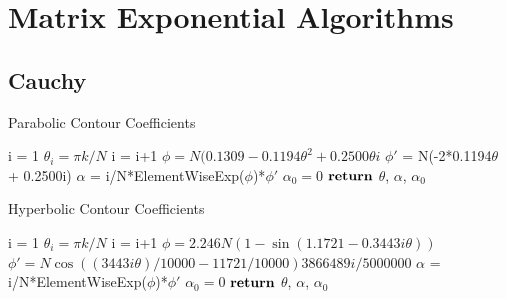 \section{Matrix Exponential Algorithms}
\label{appen:matexpalg}

\subsection{Cauchy}
\begin{algorithm}
	\caption{Parabolic Contour Coefficients} 
	\begin{algorithmic}[1]
		\State i = 1 
		 
		    \State $\theta_{i} = \pi k/N$
		    \State i = i+1
		\EndFor
		\State $\phi = N(0.1309 - 0.1194\theta^{2} + 0.2500\theta i$ 
		\State $\phi'$ = N(-2*0.1194$\theta$ + 0.2500i) 
		\State $\alpha$ = i/N*ElementWiseExp($\phi$)*$\phi'$ 
		\State $\alpha_{0} = 0$
		\State ${\text{\textbf{return}}}$ $\theta$, $\alpha$, $\alpha_{0}$
		\EndProcedure
	\end{algorithmic} 
	\label{alg:parabolicCoeffs}
\end{algorithm}

\begin{algorithm}
	\caption{Hyperbolic Contour Coefficients} 
	\begin{algorithmic}[1]
		\State i = 1  
		 
		    \State $\theta_{i} = \pi k/N$
		    \State i = i+1
		\EndFor
		\State $\phi = 2.246N(1 - \sin(1.1721 - 0.3443i\theta))$ 
		\State $\phi' = N\cos((3443i\theta) /10000 - 11721/10000)3866489i/5000000$ 
		\State $\alpha$ = i/N*ElementWiseExp($\phi$)*$\phi'$ 
		\State $\alpha_{0} = 0$
		\State ${\text{\textbf{return}}}$ $\theta$, $\alpha$, $\alpha_{0}$
		\EndProcedure
	\end{algorithmic} 
	\label{alg:hyperbolicCoeffs}
\end{algorithm}

